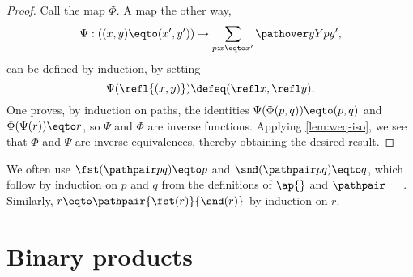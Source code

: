 \begin{proof}
  Call the map $\Phi$.
  A map the other way,
  \[
    \Psi : ((x,y) \eqto (x',y')) \to \sum_{p:x \eqto x'} \pathover y Y p {y'},
  \]
  can be defined by induction, by setting
  \[
    \Psi (\refl {(x,y)}) \defeq (\refl x, \refl y).
  \]
  One proves, by induction on paths, the identities $ \Psi ( \Phi (p,q) ) \eqto (p,q) $ and $ \Phi (\Psi ( r )) \eqto r$, so $\Psi$ and $\Phi$ are inverse functions.
  Applying \cref{lem:weq-iso}, we see that $\Phi$ and $\Psi$ are inverse equivalences, thereby obtaining the desired result.
\end{proof}

We often use $\fst(\pathpair p q) \eqto p$ and $\snd(\pathpair p q) \eqto q$,
which follow by induction on $p$ and $q$ from the definitions of $\ap{}$ and $\pathpair \_ \_$.
Similarly, $r \eqto \pathpair {\fst(r)}{\snd(r)}$ by induction on $r$.

\section{Binary products}
\label{sec:binprod-types}

